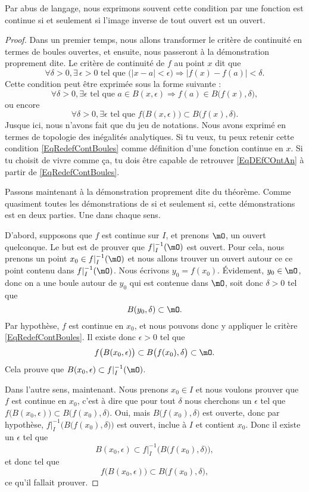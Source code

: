 Par abus de langage, nous exprimons souvent cette condition par \og une fonction est continue si et seulement si l'image inverse de tout ouvert est un ouvert\fg.

\begin{proof}

Dans un premier temps, nous allons transformer le critère de continuité en termes de boules ouvertes, et ensuite, nous passeront à la démonstration proprement dite. Le critère de continuité de $f$ au point $x$ dit que
\begin{equation}		\label{EqDEfCOntAn}
  \forall \delta>0,\exists\,\epsilon>0\text{ tel que }\big( | x-a |< \epsilon \big)\Rightarrow| f(x)-f(a) |<\delta.
\end{equation}
Cette condition peut être exprimée sous la forme suivante :
\[ 
  \forall \delta>0,\exists\epsilon\text{ tel que } a\in B(x,\epsilon)\Rightarrow f(a)\in B\big( f(x),\delta \big),
\]
ou encore
\begin{equation}		\label{EqRedefContBoules}
  \forall \delta>0,\exists\epsilon\text{ tel que } f\big( B(x,\epsilon) \big)\subset B\big( f(x),\delta \big).
\end{equation}
Jusque ici, nous n'avons fait que du jeu de notations. Nous avons exprimé en termes de topologie des inégalités analytiques. Si tu veux, tu peux retenir cette condition \eqref{EqRedefContBoules} comme définition d'une fonction continue en $x$. Si tu choisit de vivre comme ça, tu dois être capable de retrouver \eqref{EqDEfCOntAn} à partir de \eqref{EqRedefContBoules}.
 
Passons maintenant à la démonstration proprement dite du théorème. Comme quasiment toutes les démonstrations de \og si et seulement si\fg, cette démonstrations est en deux parties. Une dans chaque sens.

D'abord, supposons que $f$ est continue sur $I$, et prenons $\mO$, un ouvert quelconque. Le but est de prouver que $f|_I^{-1}(\mO)$ est ouvert. Pour cela, nous prenons un point $x_0\in f|_I^{-1}(\mO)$ et nous allons trouver un ouvert autour ce ce point contenu dans $f|_I^{-1}(\mO)$. Nous écrivons $y_0=f(x_0)$. Évidement, $y_0\in\mO$, donc on a une boule autour de $y_0$ qui est contenue dans $\mO$, soit donc $\delta>0$ tel que
\[  
  B(y_0,\delta)\subset\mO.
\]
Par hypothèse, $f$ est continue en $x_0$, et nous pouvons donc y appliquer le critère \eqref{EqRedefContBoules}. Il existe donc $\epsilon>0$ tel que 
\[ 
  f\big( B(x_0,\epsilon) \big)\subset B\big( f(x_0),\delta \big)\subset\mO.
\]
Cela prouve que $B(x_0,\epsilon)\subset f|_I^{-1}(\mO)$.

Dans l'autre sens, maintenant. Nous prenons $x_0\in I$ et nous voulons prouver que $f$ est continue en $x_0$, c'est à dire que pour tout $\delta$ nous cherchons un $\epsilon$ tel que $f\big( B(x_0,\epsilon) \big)\subset B\big( f(x_0),\delta \big)$. Oui, mais $B\big( f(x_0),\delta \big)$ est ouverte, donc par hypothèse, $f|_I^{-1}\Big( B\big( f(x_0),\delta \big) \Big)$ est ouvert, inclue à $I$ et contient $x_0$. Donc il existe un $\epsilon$ tel que
\[ 
  B(x_0,\epsilon)\subset f|_I^{-1}\Big( B\big( f(x_0),\delta \big) \Big),
\]
et donc tel que 
\[ 
  f\big( B(x_0,\epsilon) \big)\subset B\big( f(x_0),\delta \big),
\]
ce qu'il fallait prouver.
\end{proof}
